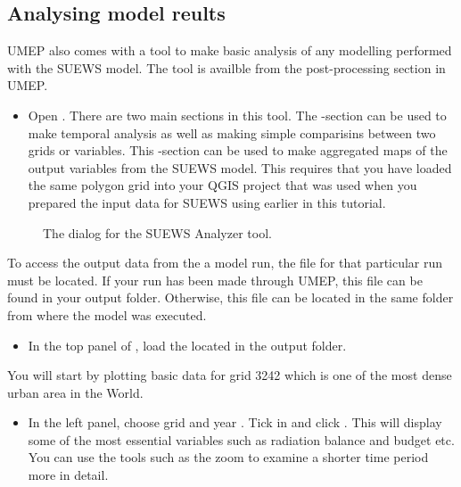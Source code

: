 \documentclass[letterpaper,10pt,english]{sphinxmanual}
\begin{document}
\subsection{Analysing model reults}
\label{\detokenize{Tutorials/SuewsSpatial:analysing-model-reults}}
UMEP also comes with a tool to make basic analysis of any modelling performed with the SUEWS model. The {\hyperref[\detokenize{post_processor/Urban Energy Balance SUEWS Analyser:suewsanalyser}]{}} tool is availble from the post-processing section in UMEP.
\begin{itemize}
\item {} 
Open . There are two main sections in this tool. The -section can be used to make temporal analysis as well as making simple comparisins between two grids or variables. This -section can be used to make aggregated maps of the output variables from the SUEWS model. This requires that you have loaded the same polygon grid into your QGIS project that was used when you prepared the input data for SUEWS using  earlier in this tutorial.

\end{itemize}

\begin{figure}[htbp]
\centering
\capstart

\noindent{}
\caption{The dialog for the SUEWS Analyzer tool.}\label{\detokenize{Tutorials/SuewsSpatial:id14}}\end{figure}

To access the output data from the a model run, the  file for that particular run must be located. If your run has been made through UMEP, this file can be found in your output folder. Otherwise, this file can be located in the same folder from where the model was executed.
\begin{itemize}
\item {} 
In the top panel of , load the  located in the output folder.

\end{itemize}

You will start by plotting basic data for grid 3242 which is one of the most dense urban area in the World.
\begin{itemize}
\item {} 
In the left panel, choose grid  and year . Tick in  and click . This will display some of the most essential variables such as radiation balance and budget etc. You can use the tools such as the zoom to examine a shorter time period more in detail.

\end{itemize}
\end{document}

